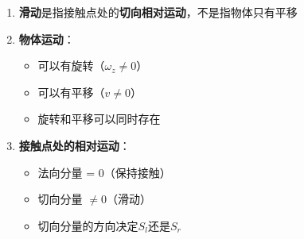 \documentclass[12pt,a4paper]{article}
\begin{document}
\begin{enumerate}
\item \textbf{滑动}是指接触点处的\textbf{切向相对运动}，不是指物体只有平移

\item \textbf{物体运动}：
   \begin{itemize}
   \item 可以有旋转（$\omega_z \neq 0$）
   \item 可以有平移（$v \neq 0$）
   \item 旋转和平移可以同时存在
   \end{itemize}

\item \textbf{接触点处的相对运动}：
   \begin{itemize}
   \item 法向分量 = 0（保持接触）
   \item 切向分量 $\neq 0$（滑动）
   \item 切向分量的方向决定$S_l$还是$S_r$
   \end{itemize}
\end{enumerate}
\end{document}
